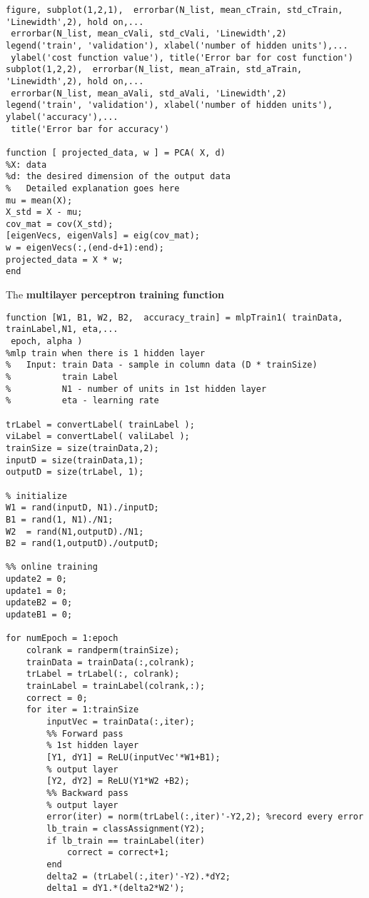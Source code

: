 \documentclass[a4paper]{article}
\begin{document}
\begin{spacing}{2.0}
\begin{lstlisting}
figure, subplot(1,2,1),  errorbar(N_list, mean_cTrain, std_cTrain, 'Linewidth',2), hold on,...
 errorbar(N_list, mean_cVali, std_cVali, 'Linewidth',2)
legend('train', 'validation'), xlabel('number of hidden units'),...
 ylabel('cost function value'), title('Error bar for cost function')
subplot(1,2,2),  errorbar(N_list, mean_aTrain, std_aTrain, 'Linewidth',2), hold on,...
 errorbar(N_list, mean_aVali, std_aVali, 'Linewidth',2)
legend('train', 'validation'), xlabel('number of hidden units'), ylabel('accuracy'),...
 title('Error bar for accuracy')

function [ projected_data, w ] = PCA( X, d)
%X: data
%d: the desired dimension of the output data
%   Detailed explanation goes here
mu = mean(X);
X_std = X - mu;
cov_mat = cov(X_std);
[eigenVecs, eigenVals] = eig(cov_mat);
w = eigenVecs(:,(end-d+1):end);
projected_data = X * w;
end

\end{lstlisting}


\newpage
\Large{The \textbf{multilayer perceptron training function} }
\normalsize
\begin{lstlisting}
function [W1, B1, W2, B2,  accuracy_train] = mlpTrain1( trainData, trainLabel,N1, eta,...
 epoch, alpha )
%mlp train when there is 1 hidden layer
%   Input: train Data - sample in column data (D * trainSize)
%          train Label
%          N1 - number of units in 1st hidden layer
%          eta - learning rate

trLabel = convertLabel( trainLabel );
viLabel = convertLabel( valiLabel );
trainSize = size(trainData,2);
inputD = size(trainData,1);
outputD = size(trLabel, 1);

% initialize
W1 = rand(inputD, N1)./inputD;
B1 = rand(1, N1)./N1;
W2  = rand(N1,outputD)./N1;
B2 = rand(1,outputD)./outputD;

%% online training
update2 = 0;
update1 = 0;
updateB2 = 0;
updateB1 = 0;

for numEpoch = 1:epoch
    colrank = randperm(trainSize);
    trainData = trainData(:,colrank);
    trLabel = trLabel(:, colrank);
	trainLabel = trainLabel(colrank,:);
    correct = 0;
    for iter = 1:trainSize
        inputVec = trainData(:,iter);
        %% Forward pass
        % 1st hidden layer
        [Y1, dY1] = ReLU(inputVec'*W1+B1);
        % output layer 
        [Y2, dY2] = ReLU(Y1*W2 +B2);
        %% Backward pass
        % output layer     
        error(iter) = norm(trLabel(:,iter)'-Y2,2); %record every error
        lb_train = classAssignment(Y2);
        if lb_train == trainLabel(iter)
            correct = correct+1;
        end
        delta2 = (trLabel(:,iter)'-Y2).*dY2;
        delta1 = dY1.*(delta2*W2');         
        

\end{lstlisting}
\end{spacing}
\end{document}
